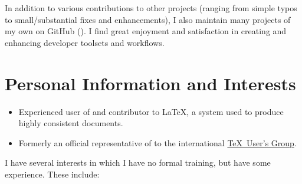 \documentclass{simplecv}
\begin{document}
In addition to various contributions to other projects (ranging from
simple typos to small\slash substantial fixes and enhancements), I
also maintain many projects of my own on GitHub
().
I find great enjoyment and satisfaction in creating and enhancing
developer toolsets and workflows.


\fi
\vfill
\section{Personal Information and Interests}
\begin{itemize}
\item Experienced user of and contributor to \LaTeX, a system
  used to produce highly consistent documents.
\item Formerly an official representative of
  \href{http://meta.tex.stackexchange.com/a/4174/17423}{}
  to the international \href{http://www.tug.org}{\TeX\ User's Group}.
\end{itemize}

\bigskip
\bigskip

\noindent
I have several interests in which I have no formal training,
  but have some experience.
These include:

\medskip
\end{document}
